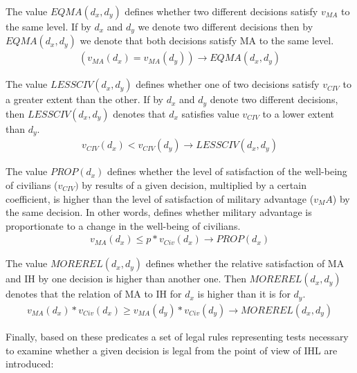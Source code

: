 \begin{ddefinition}
The value $EQMA(d_x,d_y)$ defines whether two different decisions satisfy $v_{MA}$ to the same level. If by $d_x$ and $d_y$ we denote two different decisions then by $EQMA(d_x,d_y)$ we denote that both decisions satisfy MA to the same level.
\begin{align*}
    (v_{MA}(d_x) = v_{MA}(d_y)) \rightarrow EQMA(d_x,d_y)
\end{align*}
\end{ddefinition}
\begin{ddefinition}
The value $LESSCIV(d_x,d_y)$ defines whether one of two decisions satisfy $v_{CIV}$ to a greater extent than the other. If by $d_x$ and $d_y$ denote two different decisions, then $LESSCIV(d_x,d_y)$ denotes that $d_x$ satisfies value $v_{CIV}$ to a lower extent than $d_y$. 
\begin{align*}
v_{CIV}(d_x) < v_{CIV}(d_y) \rightarrow LESSCIV(d_x,d_y)
\end{align*}
\end{ddefinition}
\begin{ddefinition}
\label{formula:proportionalityTest}
The value $PROP(d_x)$ defines whether the level of satisfaction of the well-being of civilians ($v_{CIV})$ by results of a given decision, multiplied by a certain coefficient, is higher than the level of satisfaction of military advantage ($v_MA$) by the same decision. In other words, defines whether military advantage is proportionate to a change in the well-being of civilians.
\begin{align*}
 v_{MA}(d_x) \leq p*v_{Civ}(d_x) \rightarrow PROP(d_x)  
\end{align*}
\end{ddefinition}
\begin{ddefinition}
The value $MOREREL(d_x,d_y)$ defines whether the relative satisfaction of MA and IH by one decision is higher than another one. Then $MOREREL(d_x,d_y)$ denotes that the relation of MA to IH for $d_x$ is higher than it is for $d_y$.
\begin{align*}
v_{MA}(d_x)*v_{Civ}(d_x) \geq v_{MA}(d_y)*v_{Civ}(d_y) \rightarrow MOREREL(d_x,d_y)   
\end{align*}
\end{ddefinition}


Finally, based on these predicates a set of legal rules representing tests necessary to examine whether a given decision is legal from the point of view of IHL are introduced:

